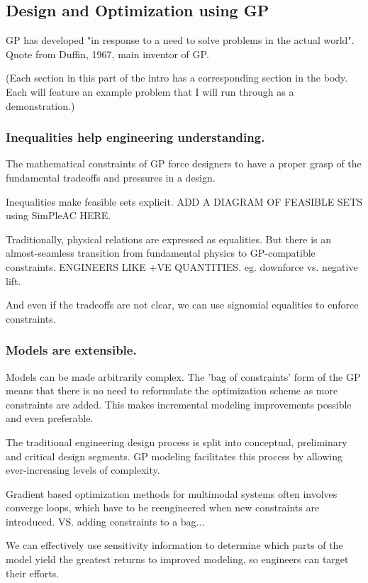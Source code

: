 \documentclass{aiaa-pretty}
\begin{document}
\subsection{Design and Optimization using \gls{GP}}

\gls{GP} has developed "in response to a need to solve problems in the actual world".~\cite{duffingp} Quote from Duffin, 1967, main inventor of GP. 

(Each section in this part of the intro has a corresponding section in the body. Each will feature an example problem that I will run through as a demonstration.) 

\subsubsection{Inequalities help engineering understanding.}
The mathematical constraints of \gls{GP} force designers to have a proper grasp of the fundamental tradeoffs and pressures in a design.

Inequalities make feasible sets explicit. ADD A DIAGRAM OF FEASIBLE SETS using SimPleAC HERE. 

Traditionally, physical relations are expressed as equalities. But there is an almost-seamless transition from fundamental physics to GP-compatible constraints. ENGINEERS LIKE +VE QUANTITIES. eg. downforce vs. negative lift. 

And even if the tradeoffs are not clear, we can use signomial equalities to enforce constraints. 

\subsubsection{Models are extensible.}
Models can be made arbitrarily complex. The 'bag of constraints' form of the GP means that there is no need to reformulate the optimization scheme as more constraints are added. This makes incremental modeling improvements possible and even preferable. 

The traditional engineering design process is split into conceptual, preliminary and critical design segments. GP modeling facilitates this process by allowing ever-increasing levels of complexity.

Gradient based optimization methods for multimodal systems often involves converge loops, which have to be reengineered when new constraints are introduced. VS. adding constraints to a bag...

We can effectively use sensitivity information to determine which parts of the model yield the greatest returns to improved modeling, so engineers can target their efforts. 
\end{document}
